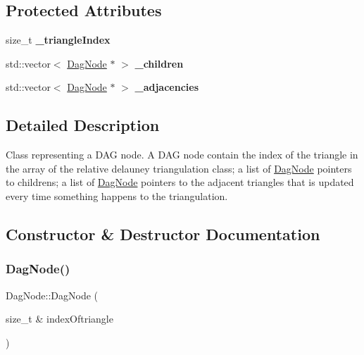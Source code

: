 \subsection*{Protected Attributes}
\begin{DoxyCompactItemize}
\item 
\mbox{\label{classDagNode_ac7d609f02e4b2bcd2c9636164496ce78}} 
size\+\_\+t {\bfseries \+\_\+triangle\+Index}
\item 
\mbox{\label{classDagNode_a35fd3faa2d6c1edb9d8c94817ec9634c}} 
std\+::vector$<$ \hyperlink{classDagNode}{Dag\+Node} $\ast$ $>$ {\bfseries \+\_\+children}
\item 
\mbox{\label{classDagNode_a5ff072d7f04f759ed8c039578faf0b98}} 
std\+::vector$<$ \hyperlink{classDagNode}{Dag\+Node} $\ast$ $>$ {\bfseries \+\_\+adjacencies}
\end{DoxyCompactItemize}


\subsection{Detailed Description}
Class representing a D\+AG node. A D\+AG node contain the index of the triangle in the array of the relative delauney triangulation class; a list of \hyperlink{classDagNode}{Dag\+Node} pointers to childrens; a list of \hyperlink{classDagNode}{Dag\+Node} pointers to the adjacent triangles that is updated every time something happens to the triangulation. 

\subsection{Constructor \& Destructor Documentation}
\mbox{\label{classDagNode_ad44cf14086cd653ba9ede6762da32e83}} 
\subsubsection{\texorpdfstring{Dag\+Node()}{DagNode()}}
{\footnotesize\ttfamily Dag\+Node\+::\+Dag\+Node (\begin{DoxyParamCaption}\item[{size\+\_\+t \&}]{index\+Oftriangle }\end{DoxyParamCaption})\hspace{0.3cm}{\ttfamily [inline]}}



